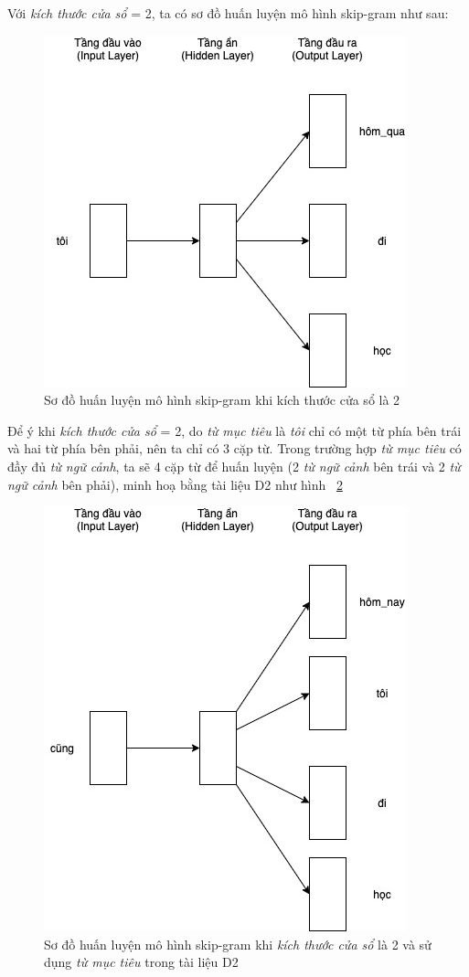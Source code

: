 Với \textit{kích thước cửa sổ} = 2, ta có sơ đồ huấn luyện mô hình skip-gram như sau:
\clearpage
\begin{figure}[!h]
	\centering
		\includegraphics[width=0.5\columnwidth]{books/artificial-neural-network/chapter04/figure/skip-gram-window-size-2.jpg}
        \caption{Sơ đồ huấn luyện mô hình skip-gram khi kích thước cửa sổ là 2}
        \label{fig:skip_gram_window_size_2}
\end{figure}

Để ý khi \textit{kích thước cửa sổ} = 2, do \textit{từ mục tiêu} là \textit{tôi} chỉ có một từ phía bên trái và hai từ phía bên phải, nên ta chỉ có 3 cặp từ. Trong trường hợp \textit{từ mục tiêu} có đầy đủ \textit{từ ngữ cảnh}, ta sẽ 4 cặp từ để huấn luyện (2 \textit{từ ngữ cảnh} bên trái và 2 \textit{từ ngữ cảnh} bên phải), minh hoạ bằng tài liệu D2 như hình ~\ref{fig:skip_gram_window_size_2_full}

\begin{figure}[!h]
	\centering
		\includegraphics[width=0.5\columnwidth]{books/artificial-neural-network/chapter04/figure/skip-gram-window-size-2-full.jpg}
        \caption{Sơ đồ huấn luyện mô hình skip-gram khi \textit{kích thước cửa sổ} là 2 và sử dụng \textit{từ mục tiêu} trong tài liệu D2}
        \label{fig:skip_gram_window_size_2_full}
\end{figure}

